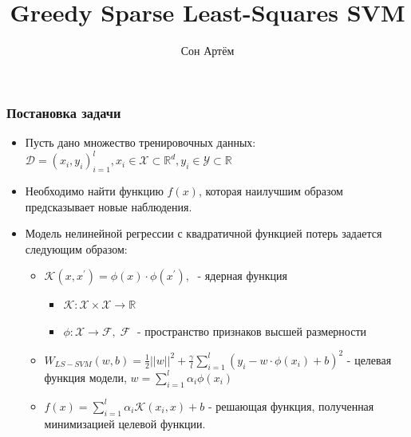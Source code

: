 \documentclass{beamer}
\title{Greedy Sparse Least-Squares SVM}
\author{Сон Артём}
\begin{document}
\maketitle

\begin{frame}
	\frametitle{Постановка задачи}
	\begin{itemize}
		\item Пусть дано множество тренировочных данных:
		      $ \mathcal{D} = {(x_i, y_i)}_{i = 1}^{l}, x_i \in \mathcal{X} \subset
			      \mathbb{R}^d, y_i \in \mathcal{Y} \subset \mathbb{R}$
		\item Необходимо найти функцию $f(x)$, которая наилучшим образом
		      предсказывает новые наблюдения.
		\item Модель нелинейной регрессии с квадратичной функцией
		      потерь задается следующим образом:
		      \begin{itemize}
			      \item $\mathcal{K}(x, x^{\prime}) = \phi(x) \cdot \phi(x^\prime), \;$
			            - ядерная функция
			            \begin{itemize}
				            \item $\mathcal{K} : \mathcal{X} \times \mathcal{X}
					                  \rightarrow \mathbb{R}$
				            \item $\phi: \mathcal{X} \rightarrow \mathcal{F}, \;
					                  \mathcal{F} \;$  - пространство признаков высшей
				                  размерности
			            \end{itemize}
			      \item $W_{LS-SVM}(w, b) = \frac{1}{2} ||w||^2 + \frac{\gamma}{l}
				            \sum_{i = 1}^{l}(y_i - w \cdot \phi(x_i) + b)^2$
			            - целевая функция модели,
			            $w = \sum_{i=1}^{l} \alpha_i \phi(x_i)$
			      \item $f(x) = \sum_{i = 1}^{l} \alpha_i \mathcal{K}(x_i, x) + b$ -
			            решающая функция, полученная минимизацией целевой функции.
		      \end{itemize}
	\end{itemize}

\end{frame}
\end{document}
